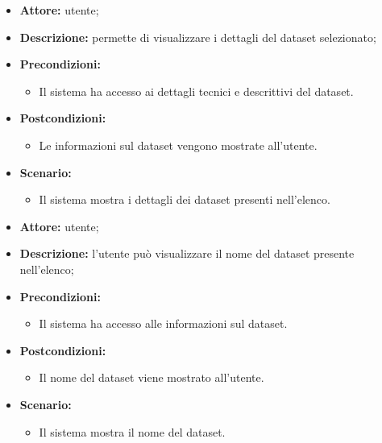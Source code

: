     \begin{itemize}
        \item \textbf{Attore:} utente;
        \item \textbf{Descrizione:} permette di visualizzare i dettagli del dataset selezionato;
        \item \textbf{Precondizioni:}
        \begin{itemize}
            \item Il sistema ha accesso ai dettagli tecnici e descrittivi del dataset.
        \end{itemize}
        \item \textbf{Postcondizioni:}
        \begin{itemize}
            \item Le informazioni sul dataset vengono mostrate all'utente.
        \end{itemize}
        \item \textbf{Scenario:}
        \begin{itemize}
            \item Il sistema mostra i dettagli dei dataset presenti nell'elenco.
        \end{itemize}
    \end{itemize}

    \begin{itemize}
        \item \textbf{Attore:} utente;
        \item \textbf{Descrizione:} l'utente può visualizzare il nome del dataset presente nell'elenco;
        \item \textbf{Precondizioni:}
        \begin{itemize}
            \item Il sistema ha accesso alle informazioni sul dataset.
        \end{itemize}
        \item \textbf{Postcondizioni:}
        \begin{itemize}
            \item Il nome del dataset viene mostrato all'utente.
        \end{itemize}
        \item \textbf{Scenario:}
        \begin{itemize}
            \item Il sistema mostra il nome del dataset.
        \end{itemize}
    \end{itemize}

